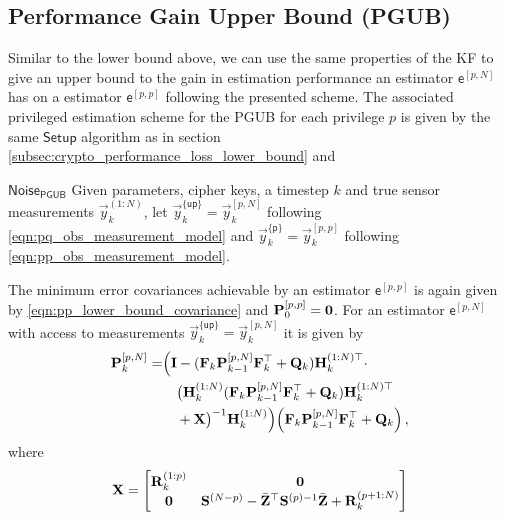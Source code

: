 \documentclass[letterpaper, 10 pt, conference]{ieeeconf}
\begin{document}
\subsection{Performance Gain Upper Bound (PGUB)}\label{subsec:crypto_performance_gain_upper_bound}
Similar to the lower bound above, we can use the same properties of the KF to give an upper bound to the gain in estimation performance an estimator $\mathsf{e}^{[p,N]}$ has on a estimator $\mathsf{e}^{[p,p]}$ following the presented scheme. The associated privileged estimation scheme for the PGUB for each privilege $p$ is given by the same $\mathsf{Setup}$ algorithm as in section \ref{subsec:crypto_performance_loss_lower_bound} and
\begin{LaTeXdescription}
  \item[$\mathsf{Noise}_{\mathsf{PGUB}}$] Given parameters, cipher keys, a timestep $k$ and true sensor measurements $\vec{y}_k^{(1:N)}$, let $\vec{y}_k^{\{\mathsf{up}\}}=\vec{y}_k^{[p,N]}$ following \eqref{eqn:pq_obs_measurement_model} and $\vec{y}_k^{\{\mathsf{p}\}}=\vec{y}_k^{[p,p]}$ following \eqref{eqn:pp_obs_measurement_model}.
\end{LaTeXdescription}
The minimum error covariances achievable by an estimator $\mathsf{e}^{[p,p]}$ is again given by \eqref{eqn:pp_lower_bound_covariance} and ${{\mathbf{P}}}_0^{[p,p]} = {{\mathbf{0}}}$. For an estimator $\mathsf{e}^{[p,N]}$ with access to measurements $\vec{y}_k^{\{\mathsf{up}\}}=\vec{y}_k^{[p,N]}$ it is given by
\begin{equation}\label{eqn:pN_lower_bound_covariance}
  \begin{split}
    {\ensuremath{{\mathbf{P}}}}_k^{[p,N]} =& \Bigl( {{\mathbf{I}}} - ({{\mathbf{F}}}_k{{\mathbf{P}}}_{k-1}^{[p,N]}{{\mathbf{F}}}_k^\top + {{\mathbf{Q}}}_k){{\mathbf{H}}}_k^{(1:N)\top} \cdot \\
    &\quad\bigl({{\mathbf{H}}}_k^{(1:N)}({{\mathbf{F}}}_k{{\mathbf{P}}}_{k-1}^{[p,N]}{{\mathbf{F}}}_k^\top + {{\mathbf{Q}}}_k){{\mathbf{H}}}_k^{(1:N)\top} \\
    &\quad+ {{\mathbf{X}}}\bigr)^{-1}{{\mathbf{H}}}_k^{(1:N)}\Bigr)\Bigl({{\mathbf{F}}}_k{{\mathbf{P}}}_{k-1}^{[p,N]}{{\mathbf{F}}}_k^\top + {{\mathbf{Q}}}_k\Bigr)\,,
 \end{split}
\end{equation}
where
\begin{equation}
  {\ensuremath{{\mathbf{X}}}} = 
  \begin{bmatrix}
    {\ensuremath{{\mathbf{R}}}}_k^{(1:p)} & {{\mathbf{0}}}\\
    {{\mathbf{0}}} & {{\mathbf{S}}}^{(N-p)} - \bar{{{\mathbf{Z}}}}^\top{\ensuremath{{\mathbf{S}}}}^{(p)-1}\bar{{{\mathbf{Z}}}} + {{\mathbf{R}}}_k^{(p+1:N)}
  \end{bmatrix}
\end{equation}
\end{document}
